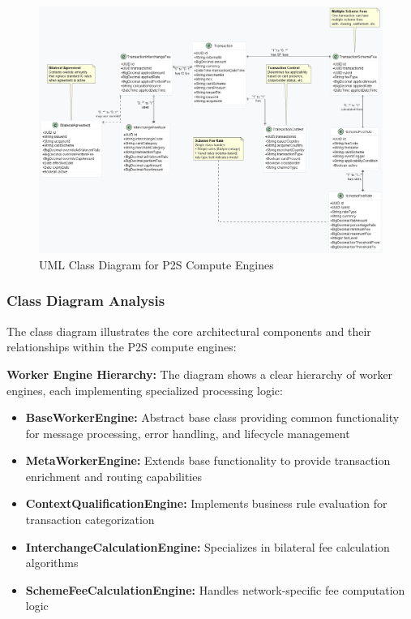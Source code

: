 \begin{figure}[H]
    \centering
    \includegraphics[width=1.05\textwidth]{out/diagrams/plantuml/in/class-diagram/class-diagram.png}
    \caption{UML Class Diagram for P2S Compute Engines}
    \label{fig:class_diagram}
\end{figure}

\subsubsection{Class Diagram Analysis}

The class diagram illustrates the core architectural components and their relationships within the P2S compute engines:

\textbf{Worker Engine Hierarchy:}
The diagram shows a clear hierarchy of worker engines, each implementing specialized processing logic:
\begin{itemize}
    \item \textbf{BaseWorkerEngine:} Abstract base class providing common functionality for message processing, error handling, and lifecycle management
    \item \textbf{MetaWorkerEngine:} Extends base functionality to provide transaction enrichment and routing capabilities
    \item \textbf{ContextQualificationEngine:} Implements business rule evaluation for transaction categorization
    \item \textbf{InterchangeCalculationEngine:} Specializes in bilateral fee calculation algorithms
    \item \textbf{SchemeFeeCalculationEngine:} Handles network-specific fee computation logic
\end{itemize}

